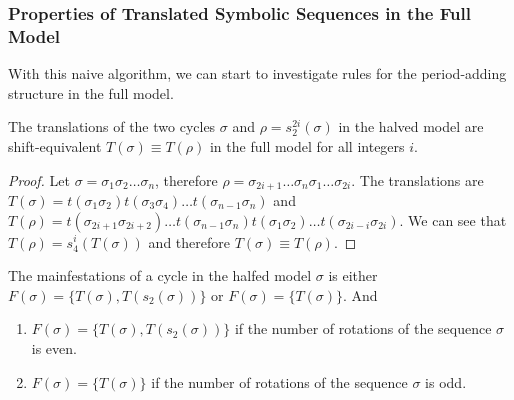 \subsubsection{Properties of Translated Symbolic Sequences in the Full Model}

With this naive algorithm, we can start to investigate rules for the period-adding structure in the full model.

\begin{lemma}
	\label{lemma:equivalence.translations}
	The translations of the two cycles $\sigma$ and $\rho = s_2^{2i}(\sigma)$ in the halved model are shift-equivalent $T(\sigma) \equiv T(\rho)$ in the full model for all integers $i$.
\end{lemma}

\begin{proof}
	Let $\sigma = \sigma_1\sigma_2 \dots \sigma_n$, therefore $\rho = \sigma_{2i+1} \dots \sigma_n\sigma_1 \dots \sigma_{2i}$.
	The translations are $T(\sigma) = t(\sigma_1\sigma_2)t(\sigma_3\sigma_4) \dots t(\sigma_{n-1}\sigma_n)$
	and $T(\rho) = t(\sigma_{2i+1}\sigma_{2i+2}) \dots t(\sigma_{n-1}\sigma_n)t(\sigma_1\sigma_2) \dots t(\sigma_{2i-i}\sigma_{2i})$.
	We can see that $T(\rho) = s_4^i(T(\sigma))$ and therefore $T(\sigma) \equiv T(\rho)$.
\end{proof}

\begin{theorem}
	\label{theorem:coexistence.even}
	The mainfestations of a cycle in the halfed model $\sigma$ is either $F(\sigma) = \{T(\sigma), T(s_2(\sigma))\}$ or $F(\sigma) = \{T(\sigma)\}$.
	And \begin{enumerate}
		\item $F(\sigma) = \{T(\sigma), T(s_2(\sigma))\}$ if the number of rotations of the sequence $\sigma$ is even.
		\item $F(\sigma) = \{T(\sigma)\}$ if the number of rotations of the sequence $\sigma$ is odd.
	\end{enumerate}
\end{theorem}


